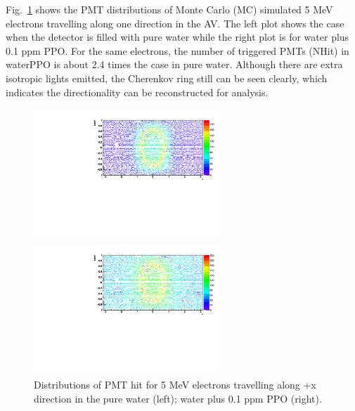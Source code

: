 \documentclass[preprint,12pt]{elsarticle}
\numberwithin{equation}{section}
\begin{document}
Fig.~\ref{pmt_wls} shows the PMT distributions of Monte Carlo (MC) simulated 5 MeV electrons travelling along one direction in the AV. The left plot shows the case when the detector is filled with pure water while the right plot is for water plus 0.1 ppm PPO. For the same electrons, the number of triggered PMTs (NHit) in waterPPO is about 2.4 times the case in pure water. Although there are extra isotropic lights emitted, the Cherenkov ring still can be seen clearly, which indicates the directionality can be reconstructed for analysis.  

\begin{figure}[htbp]
	\centering
	\begin{minipage}[t]{0.48\textwidth}
		\centering
		\includegraphics[width=7cm]{PMT_5MeVElectronWater.pdf}
	\end{minipage}
	\begin{minipage}[t]{0.48\textwidth}
		\centering
		\includegraphics[width=7cm]{PMT_5MeVElectron0p1ppmPPO.pdf}
	\end{minipage}
	\caption{Distributions of PMT hit for 5 MeV electrons travelling along +x direction in the pure water (left); water plus 0.1 ppm PPO (right).}
	\label{pmt_wls}
\end{figure}

%
\end{document}
